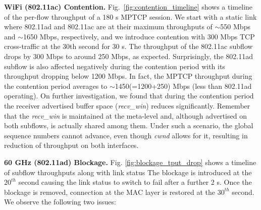 \noindent\textbf{WiFi (802.11ac) Contention. } Fig.~\ref{fig:contention_timeline} shows a timeline of the
per-flow throughput of a 180 s MPTCP session. We start with a static link where 802.11ad and 802.11ac are 
at their maximum throughputs of $\sim$550 Mbps and $\sim$1650 Mbps, respectively, and we introduce
contention with 300 Mbps TCP cross-traffic at the 30th second for 30 s. The throughput of the 
802.11ac subflow drops by 300 Mbps to around 250 Mbps, as expected. Surprisingly, the 802.11ad subflow is also
affected negatively during the contention period with its throughput dropping below 1200 Mbps.
In fact, the MPTCP throughput during the contention period averages to $\sim$1450(=1200+250) Mbps (less than 802.11ad operating). 
On further investigation, we found that during the contention period the receiver advertised buffer space (\emph{recv\_win}) reduces significantly. 
Remember that the \emph{recv\_win} is maintained at the meta-level and, although advertised on both subflows, is actually shared 
among them. Under such a scenario, the global sequence numbers
cannot advance, even though \emph{cwnd} allows for it,
resulting in reduction of throughput on both interfaces.

\begin{figure*}[t]
    \centering
    \hfill
    \hfill
    \vspace{-0.15in}
    \caption{\name}
    \vspace{-0.1in}
\end{figure*}
\fi

\noindent\textbf{60 GHz (802.11ad) Blockage. }
Fig. \ref{fig:blockage_tput_drop} shows a timeline of subflow
throughputs along with link status 
The blockage is introduced at the $20^{th}$ second causing the link status to switch to fail after a
further 2 s. Once the blockage is removed, connection at the MAC layer
is restored at the $30^{th}$ second. We observe the following two
issues:

